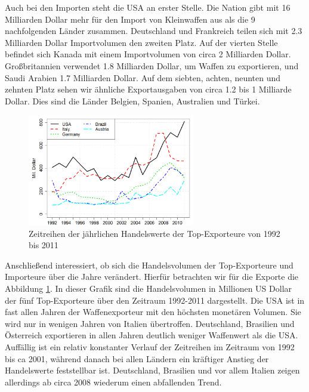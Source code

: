 \documentclass[a4paper,ngerman,oneside,titlepage,bibliography=totoc,11pt]{scrreprt}
\begin{document}
		
Auch bei den Importen steht die USA an erster Stelle. Die Nation gibt mit 16 Milliarden Dollar mehr für den Import von Kleinwaffen aus als die 9 nachfolgenden Länder zusammen. Deutschland und Frankreich teilen sich mit 2.3 Milliarden Dollar Importvolumen den zweiten Platz. Auf der vierten Stelle befindet sich Kanada mit einem Importvolumen von circa 2 Milliarden Dollar. Großbritannien verwendet 1.8 Milliarden Dollar, um Waffen zu exportieren, und Saudi Arabien 1.7 Milliarden Dollar. Auf dem siebten, achten, neunten und zehnten Platz sehen wir ähnliche Exportausgaben von circa 1.2 bis 1 Milliarde Dollar. Dies sind die Länder Belgien, Spanien, Australien und Türkei.

\begin{figure}[h]
\centering
	\includegraphics[width=0.65\textwidth]{Grafiken/ts_topsexp.png}
	\caption{Zeitreihen der jährlichen Handelswerte der Top-Exporteure von 1992 bis 2011}
	\label{fig:ts_tops1}
\end{figure}




Anschließend interessiert, ob sich die Handelsvolumen der Top-Exporteure und Importeure über die Jahre verändert. Hierfür betrachten wir für die Exporte die Abbildung \ref{fig:ts_tops1}.
In dieser Grafik sind die Handelsvolumen in Millionen US Dollar der fünf Top-Exporteure über den Zeitraum 1992-2011 dargestellt. Die USA ist in fast allen Jahren der Waffenexporteur mit den höchsten monetären Volumen. Sie wird nur in wenigen Jahren von Italien übertroffen. Deutschland, Brasilien und Österreich exportieren in allen Jahren deutlich weniger Waffenwert als die USA. Auffällig ist ein relativ konstanter Verlauf der Zeitreihen im Zeitraum von 1992 bis ca 2001, während danach bei allen Ländern ein kräftiger Anstieg der Handelswerte feststellbar ist. Deutschland, Brasilien und vor allem Italien zeigen allerdings ab circa 2008 wiederum einen abfallenden Trend.
\end{document}

